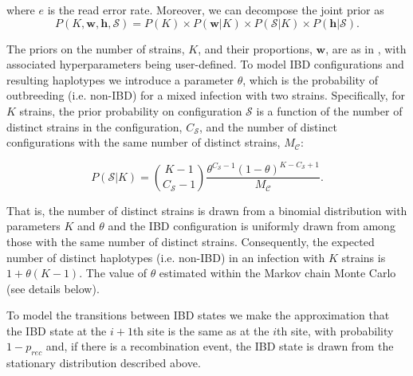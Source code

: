 \documentclass[9pt,lineno]{elife}
\begin{document}
\begin{appendixbox}
\noindent where $e$ is the read error rate.  Moreover, we can decompose the joint prior as
\begin{equation}
P(K, \mathbf{w}, \mathbf{h}, \mathcal{S}) = P(K) \times P(\mathbf{w}|K) \times P(\mathcal{S}|K) \times P(\mathbf{h}|\mathcal{S}).
\end{equation}

\noindent The priors on the number of strains, $K$, and their proportions, $\mathbf{w}$, are as in \citet{Zhu2017}, with associated hyperparameters being user-defined.  To model IBD configurations and resulting haplotypes we introduce a parameter $\theta$, which is the probability of outbreeding (i.e. non-IBD) for a mixed infection with two strains.  Specifically, for $K$ strains, the prior probability on configuration $\mathcal{S}$ is a function of the number of distinct strains in the configuration, $C_{\mathcal{S}}$, and the number of distinct configurations with the same number of distinct strains, $M_{\mathcal{C}}$:

\begin{equation}
    P(\mathcal{S}|K) = \genfrac{(}{)}{0pt}{}{K-1}{C_{\mathcal{S}}-1} \frac{\theta^{C_{\mathcal{S}}-1}(1-\theta)^{K-C_{\mathcal{S}}+1}}{M_{\mathcal{C}}}.
\end{equation}

\noindent That is, the number of distinct strains is drawn from a binomial distribution with parameters $K$ and $\theta$ and the IBD configuration is uniformly drawn from among those with the same number of distinct strains.  Consequently, the expected number of distinct haplotypes (i.e. non-IBD) in an infection with $K$ strains is $1+\theta (K-1)$. The value of $\theta$ estimated within the Markov chain Monte Carlo (see details below).


To model the transitions between IBD states we make the approximation that the IBD state at the $i+1$th site is the same as at the $i$th site, with probability $1-p_{rec}$ and, if there is a recombination event, the IBD state is drawn from the stationary distribution described above.


\end{appendixbox}
\end{document}
